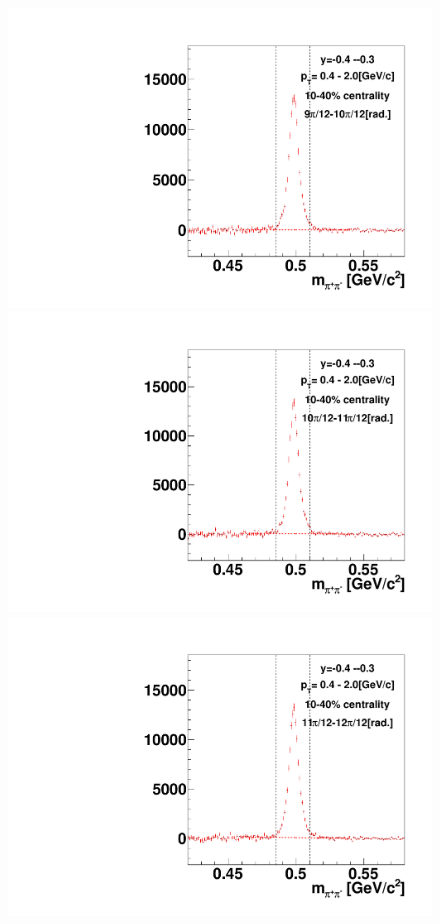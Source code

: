 \begin{figure}[h]
\includegraphics[width=0.14\linewidth]{chapterX/fig/ks_v1_sig/kf_ptslice0_cent1_ks_flow_phi10_rap8.pdf}
\includegraphics[width=0.14\linewidth]{chapterX/fig/ks_v1_sig/kf_ptslice0_cent1_ks_flow_phi11_rap8.pdf}
\includegraphics[width=0.14\linewidth]{chapterX/fig/ks_v1_sig/kf_ptslice0_cent1_ks_flow_phi12_rap8.pdf}


\end{figure}
